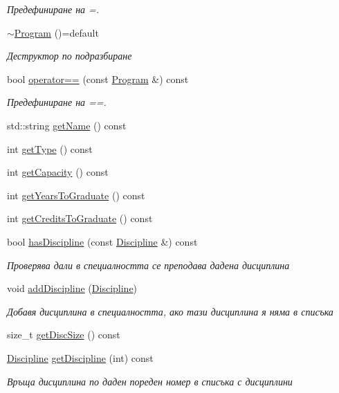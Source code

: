 \begin{DoxyCompactItemize}
\begin{DoxyCompactList}\small\item\em Предефиниране на =. \end{DoxyCompactList}\item 
\hyperlink{class_program_a1836e019558056cd131f87fb7a2a1547}{$\sim$\+Program} ()=default
\begin{DoxyCompactList}\small\item\em Деструктор по подразбиране \end{DoxyCompactList}\item 
bool \hyperlink{class_program_a3f5e4bab9e69d241abe952e17eaca44d}{operator==} (const \hyperlink{class_program}{Program} \&) const
\begin{DoxyCompactList}\small\item\em Предефиниране на ==. \end{DoxyCompactList}\item 
std\+::string \hyperlink{class_program_af1a166f11ed6c82c7377cc67085daf1f}{get\+Name} () const
\item 
int \hyperlink{class_program_a6dac45bcf5137b89bbd3a7ef77adab49}{get\+Type} () const
\item 
int \hyperlink{class_program_a72ea2125e1081701884ba85e9bc9eb73}{get\+Capacity} () const
\item 
int \hyperlink{class_program_a10ec5f4daf928ba6935fa7f23658e668}{get\+Years\+To\+Graduate} () const
\item 
int \hyperlink{class_program_a0cfb4743be3207cc4bf89f04b1c8ee50}{get\+Credits\+To\+Graduate} () const
\item 
bool \hyperlink{class_program_a050a111ad405a288aedb95de0ada2146}{has\+Discipline} (const \hyperlink{class_discipline}{Discipline} \&) const
\begin{DoxyCompactList}\small\item\em Проверява дали в специалността се преподава дадена дисциплина \end{DoxyCompactList}\item 
void \hyperlink{class_program_a383a0511ac35359940d9916f176da268}{add\+Discipline} (\hyperlink{class_discipline}{Discipline})
\begin{DoxyCompactList}\small\item\em Добавя дисциплина в специалността, ако тази дисциплина я няма в списъка \end{DoxyCompactList}\item 
size\+\_\+t \hyperlink{class_program_a3e9f88ff8d80a2207b8171c8cb05a571}{get\+Disc\+Size} () const
\item 
\hyperlink{class_discipline}{Discipline} \hyperlink{class_program_a76f3e2bc8956ccd0996caab3a1757092}{get\+Discipline} (int) const
\begin{DoxyCompactList}\small\item\em Връща дисциплина по даден пореден номер в списъка с дисциплини \end{DoxyCompactList}\end{DoxyCompactItemize}
